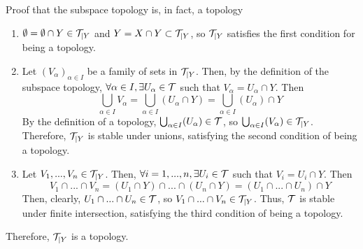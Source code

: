 
Proof that the subspace topology is, in fact, a topology
\begin{myproof}
	\begin{enumerate}
		\item $\emptyset = \emptyset\cap Y\in\mathcal{T}_{|Y}$ and $Y = X\cap Y\subset\mathcal{T}_{|Y}$, so $\mathcal{T}_{|Y}$ satisfies the first condition for being a topology.
		\item Let $(V_\alpha)_{\alpha\in I}$ be a family of sets in $\mathcal{T}_{|Y}$. Then, by the definition of the subspace topology, $\forall \alpha\in I,\exists U_\alpha\in\mathcal{T}$ such that $V_\alpha = U_\alpha\cap Y$. Then
		$$\bigcup_{\alpha\in I}V_\alpha = \bigcup_{\alpha\in I}(U_{\alpha}\cap Y) = \bigcup_{\alpha\in I}(U_{\alpha})\cap Y$$
		By the definition of a topology, $\bigcup_{\alpha\in I}(U_{\alpha})\in \mathcal{T}$, so $\bigcup_{\alpha\in I}(V_\alpha)\in\mathcal{T}_{|Y}$. Therefore, $\mathcal{T}_{|Y}$ is stable under unions, satisfying the second condition of being a topology.
		\item Let $V_1,...,V_n\in\mathcal{T}_{|Y}$. Then, $\forall i = 1,...,n,\exists U_i\in\mathcal{T}$ such that $V_i = U_i\cap Y$. Then $$V_1\cap...\cap V_n = (U_1\cap Y)\cap ...\cap(U_n\cap Y) = (U_1\cap...\cap U_n)\cap Y$$
		Then, clearly, $U_1\cap...\cap U_n\in\mathcal{T}$, so $V_1\cap...\cap V_n\in\mathcal{T}_{|Y}$. Thus, $\mathcal{T}$ is stable under finite intersection, satisfying the third condition of being a topology.
	\end{enumerate}
	Therefore, $\mathcal{T}_{|Y}$ is a topology.
\end{myproof}




